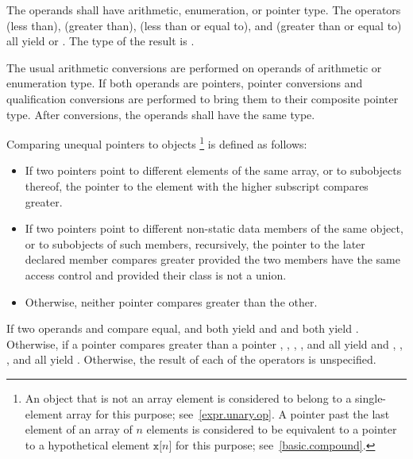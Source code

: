 The operands shall have arithmetic, enumeration, or pointer type. The
operators \tcode{<} (less than), \tcode{>} (greater than), \tcode{<=}
(less than or equal to), and \tcode{>=} (greater than or equal to) all
yield  or . The type of the result is
.

\pnum
The usual arithmetic conversions are performed on operands of arithmetic
or enumeration type. If both operands are pointers, pointer
conversions and qualification conversions
are performed to bring
them to their composite pointer type.
After conversions, the operands shall have the same type.

\pnum
Comparing unequal pointers to objects%
\footnote{An object that is not an array element is considered to belong to a
single-element array for this purpose; see~\ref{expr.unary.op}.
A pointer past the last element of an array  of $n$ elements
is considered to be equivalent to a pointer to a hypothetical element
$\mathtt{x[}n\mathtt{]}$ for this purpose; see~\ref{basic.compound}.}
is defined as follows:

\begin{itemize}
\item If two pointers point to different elements of the same array, or to
subobjects thereof, the pointer to the element with the higher subscript
compares greater.

\item If two pointers point to different non-static data members of the same
object, or to subobjects of such members, recursively,
the pointer to the later declared member compares greater provided the
two members
have the same access control
and provided their class is not a union.

\item Otherwise, neither pointer compares greater than the other.

\end{itemize}

\pnum
If two operands  and  compare equal,
 and  both yield  and  and
 both yield . Otherwise, if a pointer 
compares greater than a pointer , , ,
, and  all yield  and ,
, , and  all yield .
Otherwise, the result of each of the operators is unspecified.

